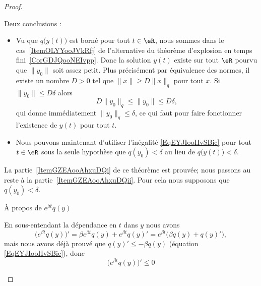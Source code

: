 \begin{proof}
\begin{subproof}
    Deux conclusions :
    \begin{itemize}
        \item
            Vu que \( q\big( y(t) \big)\) est borné pour tout \( t\in \eR\), nous sommes dans le cas~\ref{ItemOLYYooJVkRfj} de l'alternative du théorème d'explosion en temps fini~\ref{CorGDJQooNEIvpp}. Donc la solution \( y(t)\) existe sur tout \( \eR\) pourvu que \( \| y_0 \|\) soit assez petit. Plus précisément par équivalence des normes, il existe un nombre \( D>0\) tel que \( \| x \|\geq D\| x \|_q\) pour tout \( x\). Si \( \| y_0 \|\leq D\delta\) alors
            \begin{equation}
                D\| y_0 \|_q\leq \| y_0 \|\leq D\delta,
            \end{equation}
            qui donne immédiatement \( \| y_0 \|_q\leq \delta\), ce qui faut pour faire fonctionner l'existence de \( y(t)\) pour tout \( t\).
        \item
            Nous pouvons maintenant d'utiliser l'inégalité \eqref{EqEYJIooHvSBic} pour tout \( t\in \eR\) sous la seule hypothèse que \( q(y_0)<\delta\) au lieu de \( q\big( y(t) \big)<\delta\).
    \end{itemize}

    La partie~\ref{ItemGZEAooAhxuDQi} de ce théorème est prouvée; nous passons au reste à la partie~\ref{ItemGZEAooAhxuDQii}. Pour cela nous supposons que \( q(y_0)<\delta\).

\item[À propos de \(  e^{\beta t}q(y)\)]

    En sous-entendant la dépendance en \( t\) dans \( y\) nous avons
    \begin{equation}
        \Big(  e^{\beta t}q(y) \Big)'=\beta e^{\beta t}q(y)+ e^{\beta t}q(y)'= e^{\beta t}\big( \beta q(y)+q(y)' \big),
    \end{equation}
    mais nous avons déjà prouvé que \( q(y)'\leq -\beta q(y)\) (équation \eqref{EqEYJIooHvSBic}), donc
    \begin{equation}    \label{EqEJMEooFKuxTv}
        \Big(  e^{\beta t}q(y) \Big)'\leq 0
    \end{equation}


\end{subproof}
\end{proof}
